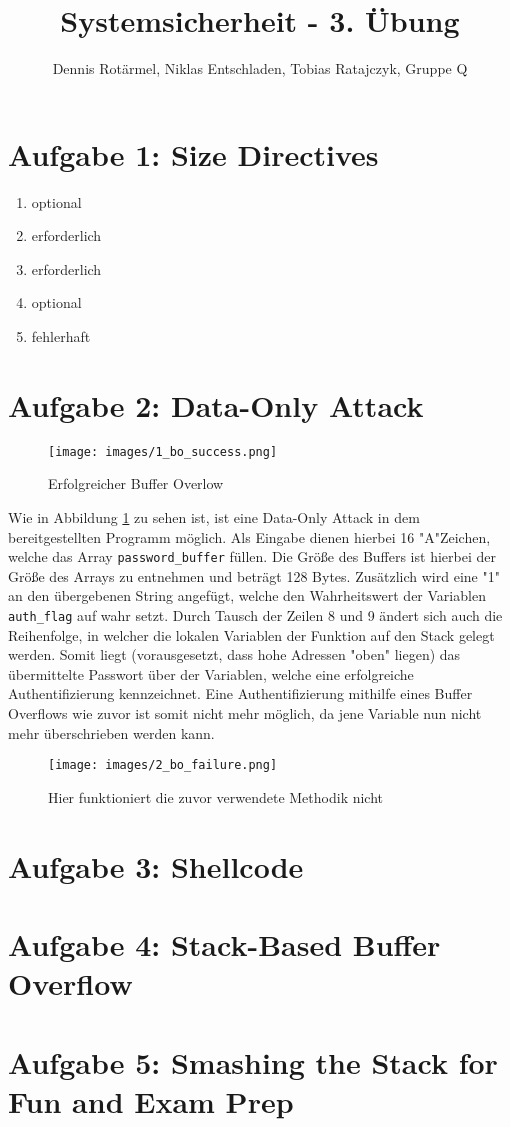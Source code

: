 \documentclass[]{scrreprt}
\title{Systemsicherheit - 3. Übung}
\author{Dennis Rotärmel, Niklas Entschladen, Tobias Ratajczyk, Gruppe Q}
\begin{document}
\maketitle
\pagebreak

\section*{Aufgabe 1: Size Directives}
\renewcommand{\labelenumi}{\alph{enumi})}
\begin{enumerate}
	\item optional
	\item erforderlich
	\item erforderlich
	\item optional
	\item fehlerhaft
\end{enumerate}

\section*{Aufgabe 2: Data-Only Attack}
\begin{figure}[h]
\centering\texttt{[image: images/1\_bo\_success.png]}
\caption{\label{fig:bosuccess}Erfolgreicher Buffer Overlow}
\end{figure}
Wie in Abbildung \ref{fig:bosuccess} zu sehen ist, ist eine Data-Only Attack in dem bereitgestellten Programm möglich. Als Eingabe dienen hierbei 16 "{}A"{}Zeichen, welche das Array \verb|password_buffer| füllen. Die Größe des Buffers ist hierbei der Größe des Arrays zu entnehmen und beträgt 128 Bytes. Zusätzlich wird eine "{}1"{} an den übergebenen String angefügt, welche den Wahrheitswert der Variablen \verb|auth_flag| auf wahr setzt. \newline
Durch Tausch der Zeilen 8 und 9 ändert sich auch die Reihenfolge, in welcher die lokalen Variablen der Funktion auf den Stack gelegt werden.
Somit liegt (vorausgesetzt, dass hohe Adressen "oben" liegen) das übermittelte Passwort über der Variablen, welche eine erfolgreiche Authentifizierung kennzeichnet.
Eine Authentifizierung mithilfe eines Buffer Overflows wie zuvor ist somit nicht mehr möglich, da jene Variable nun nicht mehr überschrieben werden kann. 
\begin{figure}[h]
\centering\texttt{[image: images/2\_bo\_failure.png]}
\caption{Hier funktioniert die zuvor verwendete Methodik nicht}
\end{figure}

\section*{Aufgabe 3: Shellcode}

\section*{Aufgabe 4: Stack-Based Buffer Overflow}

\section*{Aufgabe 5:  Smashing the Stack for Fun and Exam Prep}
	
\end{document}
